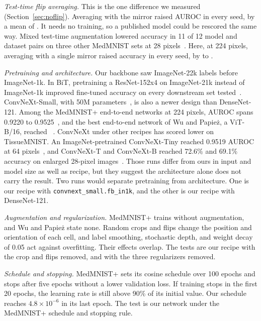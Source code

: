 \documentclass[conference]{IEEEtran}
\newif\ifanycitation
\let\citeAnyKey\cite
\renewcommand{\cite}{\global\anycitationtrue\citeAnyKey}
\begin{document}
\emph{Test-time flip averaging.} This is the one difference we measured
(Section~\ref{sec:noflip}). Averaging with the mirror raised AUROC in every seed, by a
mean of \flipGainAurocMean{}. It needs no training, so a published model could be
rescored the same way. Mixed test-time augmentation lowered accuracy in 11 of 12 model
and dataset pairs on three other MedMNIST sets at 28 pixels~\cite{medeiros2026tta}. Here,
at 224 pixels, averaging with a single mirror raised accuracy in every seed, by
\flipGainAccMin{} to \flipGainAccMax{}.

\emph{Pretraining and architecture.} Our backbone saw ImageNet-22k labels before
ImageNet-1k. In BiT, pretraining a ResNet-152x4 on ImageNet-21k instead of ImageNet-1k improved
fine-tuned accuracy on every downstream set tested~\cite{kolesnikov2020bit}.
ConvNeXt-Small, with 50M parameters~\cite{liu2022convnext}, is also a newer design than
DenseNet-121. Among the MedMNIST+ end-to-end networks at 224 pixels, AUROC spans 0.9220 to
0.9525~\cite{doerrich2025medmnistplus}, and the best end-to-end network of Wu and
Papie\.{z}, a ViT-B/16, reached \baseBestAuroc{}~\cite{wu2025rethinking}. ConvNeXt under
other recipes has scored lower on TissueMNIST. An ImageNet-pretrained ConvNeXt-Tiny
reached 0.9519 AUROC at 64 pixels~\cite{arman2026cytoecanet}, and ConvNeXt-T and
ConvNeXt-B reached 72.6\% and 69.1\% accuracy on enlarged 28-pixel
images~\cite{manzari2023medvit}. Those runs differ from ours in input and model size as
well as recipe, but they suggest the architecture alone does not carry the result. Two
runs would separate pretraining from architecture. One is our recipe with
\texttt{convnext\_small.fb\_in1k}, and the other is our recipe with DenseNet-121.

\emph{Augmentation and regularization.} MedMNIST+ trains without augmentation, and Wu and
Papie\.{z} state none. Random crops and flips change the position and orientation of each
cell, and label smoothing, stochastic depth, and weight decay of 0.05 act against
overfitting. Their effects overlap. The tests are our recipe with the crop and flips
removed, and with the three regularizers removed.

\emph{Schedule and stopping.} MedMNIST+ sets its cosine schedule over 100 epochs and stops
after five epochs without a lower validation loss. If training stops in the first 20
epochs, the learning rate is still above 90\% of its initial value. Our schedule reaches
$4.8\times10^{-6}$ in its last epoch. The test is our network under the MedMNIST+ schedule
and stopping rule.
\end{document}
